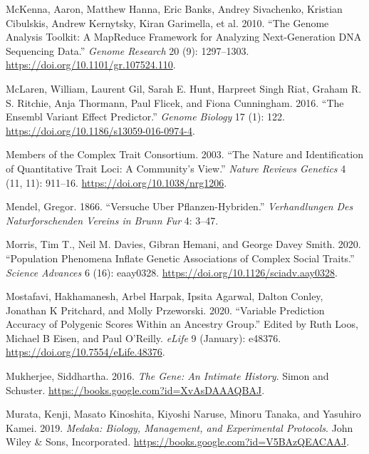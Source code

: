 \documentclass[
]{book}
\newlength{\cslhangindent}
\newlength{\cslentryspacingunit} %
\newenvironment{CSLReferences}[2] %
 {%
  \setlength{\parindent}{0pt}
  \ifodd #1
  \let\oldpar\par
  \def\par{\hangindent=\cslhangindent\oldpar}
  \fi
  \setlength{\parskip}{#2\cslentryspacingunit}
 }%
 {}
\begin{document}
\begin{CSLReferences}{1}{0}
\leavevmode{}%
McKenna, Aaron, Matthew Hanna, Eric Banks, Andrey Sivachenko, Kristian Cibulskis, Andrew Kernytsky, Kiran Garimella, et al. 2010. {``The {Genome Analysis Toolkit}: {A MapReduce} Framework for Analyzing Next-Generation {DNA} Sequencing Data.''} \emph{Genome Research} 20 (9): 1297--1303. \url{https://doi.org/10.1101/gr.107524.110}.

\leavevmode{}%
McLaren, William, Laurent Gil, Sarah E. Hunt, Harpreet Singh Riat, Graham R. S. Ritchie, Anja Thormann, Paul Flicek, and Fiona Cunningham. 2016. {``The {Ensembl Variant Effect Predictor}.''} \emph{Genome Biology} 17 (1): 122. \url{https://doi.org/10.1186/s13059-016-0974-4}.

\leavevmode{}%
Members of the Complex Trait Consortium. 2003. {``The Nature and Identification of Quantitative Trait Loci: A Community's View.''} \emph{Nature Reviews Genetics} 4 (11, 11): 911--16. \url{https://doi.org/10.1038/nrg1206}.

\leavevmode{}%
Mendel, Gregor. 1866. {``Versuche Uber Pflanzen-Hybriden.''} \emph{Verhandlungen Des Naturforschenden Vereins in Brunn Fur} 4: 3--47.

\leavevmode{}%
Morris, Tim T., Neil M. Davies, Gibran Hemani, and George Davey Smith. 2020. {``Population Phenomena Inflate Genetic Associations of Complex Social Traits.''} \emph{Science Advances} 6 (16): eaay0328. \url{https://doi.org/10.1126/sciadv.aay0328}.

\leavevmode{}%
Mostafavi, Hakhamanesh, Arbel Harpak, Ipsita Agarwal, Dalton Conley, Jonathan K Pritchard, and Molly Przeworski. 2020. {``Variable Prediction Accuracy of Polygenic Scores Within an Ancestry Group.''} Edited by Ruth Loos, Michael B Eisen, and Paul O'Reilly. \emph{eLife} 9 (January): e48376. \url{https://doi.org/10.7554/eLife.48376}.

\leavevmode{}%
Mukherjee, Siddhartha. 2016. \emph{The {Gene}: {An Intimate History}}. {Simon and Schuster}. \url{https://books.google.com?id=XvAsDAAAQBAJ}.

\leavevmode{}%
Murata, Kenji, Masato Kinoshita, Kiyoshi Naruse, Minoru Tanaka, and Yasuhiro Kamei. 2019. \emph{Medaka: {Biology}, {Management}, and {Experimental Protocols}}. {John Wiley \& Sons, Incorporated}. \url{https://books.google.com?id=V5BAzQEACAAJ}.


\end{CSLReferences}
\end{document}
